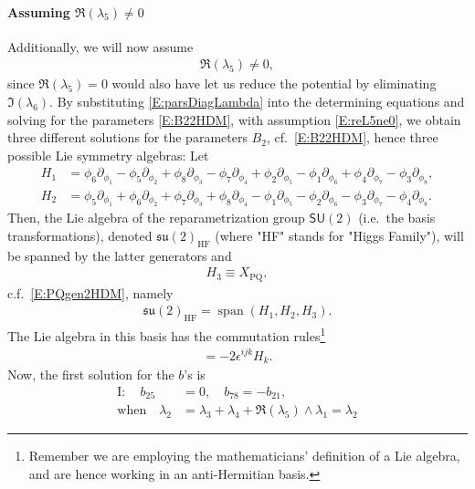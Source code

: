 \documentclass[a4paper,hidelinks, 12pt]{article}
\numberwithin{equation}{section}
\theoremstyle{plain}
\newcommand{\La}{\mathfrak}
\newcommand{\Lg}{\mathsf}
\newcommand{\nn}{\nonumber}
\newcommand{\on}{\operatorname}
\begin{document}
\paragraph{Assuming $\Re(\lambda_5)\ne 0$}
\label{sec:AssumingReLambda5Ne0}
Additionally, we will now assume
\begin{align}\label{E:reL5ne0}
	\Re(\lambda_5)\ne 0,
\end{align}
 since $\Re(\lambda_5)=0$ would also have let us reduce the potential by eliminating $\Im(\lambda_6)$.
By substituting \eqref{E:parsDiagLambda} into the determining equations  
and
solving for the parameters \eqref{E:B22HDM},
 with assumption \eqref{E:reL5ne0}, we obtain three different solutions for the parameters $B_2$, cf.~\eqref{E:B22HDM}, hence three possible Lie symmetry algebras: Let 
\begin{align}
	H_1 &=\phi_6 
   \partial_{\phi_1}-\phi _5 
   \partial_{\phi_2}+\phi _8 
   \partial_{\phi_3}-\phi _7 
   \partial_{\phi_4}+\phi _2 
   \partial_{\phi_5}-\phi _1 
   \partial_{\phi_6}+\phi _4 
   \partial_{\phi_7}-\phi _3 
   \partial_{\phi_8}, \nn \\  
	H_2&=\phi _5 
   \partial_{\phi_1}+\phi _6 
   \partial_{\phi_2}+\phi _7 
   \partial_{\phi_3}+\phi _8 
   \partial_{\phi_4}-\phi _1 
   \partial_{\phi_5}-\phi _2 
   \partial_{\phi_6}-\phi _3 
   \partial_{\phi_7}-\phi _4 
   \partial_{\phi_8}.
\end{align}
Then, the Lie algebra of the reparametrization group $\Lg{SU}(2)$
(i.e.~the basis transformations), denoted $\La{su}(2)_\text{HF}$ (where "HF" stands for "Higgs Family"), will be spanned by the latter generators and 
\begin{align}
	H_3\equiv X_\text{PQ},
\end{align}
 c.f.~\eqref{E:PQgen2HDM}, namely
 \begin{align}
	 \La{su}(2)_\text{HF}= \on{span}(H_1,H_2,H_3).
 \end{align}
	The Lie algebra in this basis has the commutation rules\footnote{Remember we are employing the mathematicians' definition of a Lie algebra, and are hence working in an anti-Hermitian basis.}
	\begin{align}
	[H_i,H_{j}]=-2\epsilon^{ijk}H_{k}.	
	\end{align}
	 Now, the first solution for the $b$'s is
\begin{align}\label{E:solIbsconds}
\text{I}:\quad	b_{25}&=0,\quad b_{78}=-b_{21}, \nn \\
	\text{when}\quad \lambda_2 &= \lambda_3+\lambda_4+\Re(\lambda_5)\wedge \lambda_1= \lambda_2
\end{align}
\end{document}
